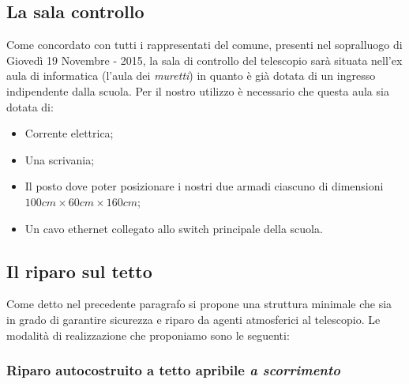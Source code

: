 \documentclass[a4paper,12pt]{article}
\begin{document}
\subsection{La sala controllo}
Come concordato con tutti i rappresentati del comune, presenti nel sopralluogo di Gioved\`i 19 Novembre - 2015, la sala di controllo del telescopio sar\`a situata nell'ex aula di informatica (l'aula dei \textit{muretti}) in quanto \`e gi\`a dotata di un ingresso indipendente dalla scuola. Per il nostro utilizzo \`e necessario che questa aula sia dotata di:
\begin{itemize}
	\item Corrente elettrica;
	\item Una scrivania;
	\item Il posto dove poter posizionare i nostri due armadi ciascuno di dimensioni $100 cm\times 60 cm \times 160 cm $;
	\item Un cavo ethernet collegato allo switch principale della scuola.
\end{itemize}

\subsection{Il riparo sul tetto}
Come detto nel precedente paragrafo si propone una struttura minimale che sia in grado di garantire sicurezza e riparo da agenti atmosferici al telescopio. Le modalit\`a di realizzazione che proponiamo sono le seguenti:


%

\subsubsection{Riparo autocostruito a tetto apribile \textit{a scorrimento}}
\end{document}

